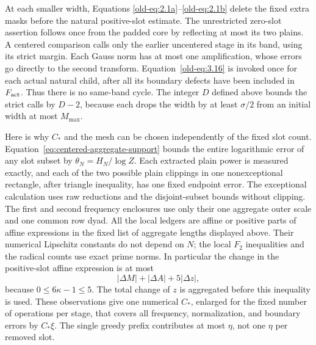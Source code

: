 \documentclass[12pt]{article}
\begin{document}
At each smaller width, Equations
\eqref{old-eq:2.1a}--\eqref{old-eq:2.1b} delete the fixed extra masks
before the natural positive-slot estimate.  The unrestricted zero-slot
assertion follows once from the padded core by reflecting at most its
two plains.  A centered comparison calls only the earlier uncentered
stage in its band, using its strict margin.  Each Gauss norm has at
most one amplification, whose errors go directly to the second
transform.  Equation~\eqref{old-eq:3.16} is invoked once for each
actual natural child, after all its boundary defects have been
included in \(F_{\rm act}\).  Thus there is no same-band cycle.
The integer \(D\) defined above bounds the strict calls by \(D-2\),
because each drops the width by at least \(\sigma/2\) from an initial
width at most \(M_{\max}\).

Here is why \(C_*\) and the mesh can be chosen independently of the
fixed slot count.  Equation~\eqref{eq:centered-aggregate-support}
bounds the entire logarithmic error of any slot subset by
\(\theta_N=H_N/\log Z\).  Each extracted plain power is measured
exactly, and each of the two possible plain clippings in one
nonexceptional rectangle, after triangle inequality, has one fixed
endpoint error.  The exceptional calculation uses raw reductions and
the disjoint-subset bounds without clipping.  The first and second frequency enclosures use only
their one aggregate outer scale and one common row dyad.  All the
local ledgers are affine or positive parts of affine expressions in
the fixed list of aggregate lengths displayed above.  Their numerical
Lipschitz constants do not depend on \(N\); the local \(F_2\)
inequalities and the radical counts use exact prime norms.  In
particular the change in the positive-slot affine expression is at most
\begin{equation}
 |\Delta M|+|\Delta A|+5|\Delta z|,
 \label{old-eq:2.1j}
\end{equation}
because \(0\le6\kappa-1\le5\).  The total change of \(z\) is
aggregated before this inequality is used.  These observations give
one numerical \(C_*\), enlarged for the fixed number of operations
per stage, that covers all frequency, normalization, and boundary
errors by \(C_*\xi\).  The single greedy prefix contributes at
most \(\eta\), not one \(\eta\) per removed slot.
\end{document}
